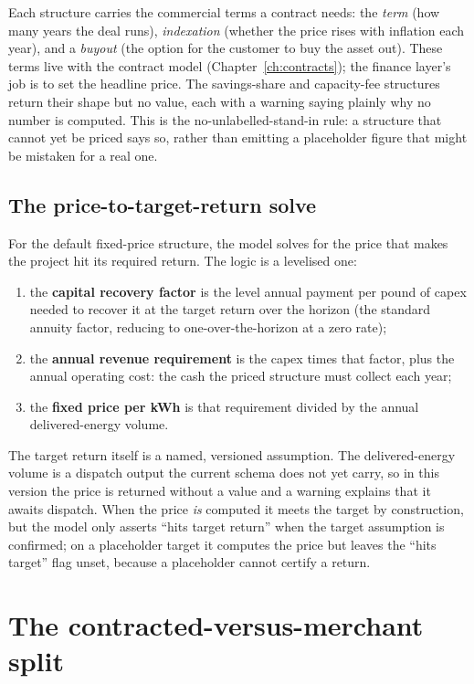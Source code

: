 Each structure carries the commercial terms a contract needs: the \emph{term} (how many years the deal runs), \emph{indexation} (whether the price rises with inflation each year), and a \emph{buyout} (the option for the customer to buy the asset out). These terms live with the contract model (Chapter~\ref{ch:contracts}); the finance layer's job is to set the headline price. The savings-share and capacity-fee structures return their shape but no value, each with a warning saying plainly why no number is computed. This is the no-unlabelled-stand-in rule: a structure that cannot yet be priced says so, rather than emitting a placeholder figure that might be mistaken for a real one.

\subsection{The price-to-target-return solve}

For the default fixed-price structure, the model solves for the price that makes the project hit its required return. The logic is a levelised one:

\begin{enumerate}
  \item the \textbf{capital recovery factor} is the level annual payment per pound of capex needed to recover it at the target return over the horizon (the standard annuity factor, reducing to one-over-the-horizon at a zero rate);
  \item the \textbf{annual revenue requirement} is the capex times that factor, plus the annual operating cost: the cash the priced structure must collect each year;
  \item the \textbf{fixed price per kWh} is that requirement divided by the annual delivered-energy volume.
\end{enumerate}

The target return itself is a named, versioned assumption. The delivered-energy volume is a dispatch output the current schema does not yet carry, so in this version the price is returned without a value and a warning explains that it awaits dispatch. When the price \emph{is} computed it meets the target by construction, but the model only asserts ``hits target return'' when the target assumption is confirmed; on a placeholder target it computes the price but leaves the ``hits target'' flag unset, because a placeholder cannot certify a return.

\section{The contracted-versus-merchant split}


